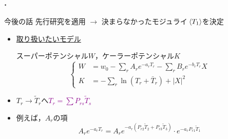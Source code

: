 \documentclass[
  a4paper,uplatex,dvipdfmx,9pt,
  xcolor = {dvipsnames,svgnames},
  hyperref ={colorlinks=true,citecolor=Navy,linkcolor=NavyBlue,urlcolor=purple}
]{beamer}
\begin{document}
\begin{frame}
  \frametitle{\thesection.\thesubsection\ \subsecname}

  \begin{boxmine}{今後の話}
    先行研究を適用
    $\rightarrow$
    決まらなかったモジュライ$\ev*{T_1}$を決定
  \end{boxmine}
  
  \begin{itemize}
    \item 
    \uline{取り扱いたいモデル}

    スーパーポテンシャル$W$，ケーラーポテンシャル$K$
    \begin{equation}
      \left\{
        \begin{alignedat}{1}
          W
          &=
          w_{0}
          -
          \sum_{r}
          A_{r}
          e^{-a_{r}T_{r}}
          -
          \sum_{r}B_{r}e^{-b_{r}T_{r}}
          X
          \\
          K
          &=
          -
          \sum_{r}\ln (T_{r}+\bar{T}_{r})
          +
          |X|^2
        \end{alignedat}
      \right.
      \nonumber
    \end{equation}
    \item 
    $T_{r}\rightarrow\tilde{T}_{r}$へ\quad \textcolor{DarkMagenta}{$T_{r}=\sum P_{rs}\tilde{T}_{s}$}
    \item 
    例えば，$A_{r}$の項
    \begin{equation}
      A_{r}e^{-a_{r}T_{r}}
      =
      A_{r}e^{-a_{r}(P_{r2}\tilde{T}_{2}+P_{r3}\tilde{T}_{3})}\cdot e^{-a_{r}P_{r1}\tilde{T}_{1}}
      \nonumber
    \end{equation}
  \end{itemize}
\end{frame}
\end{document}

